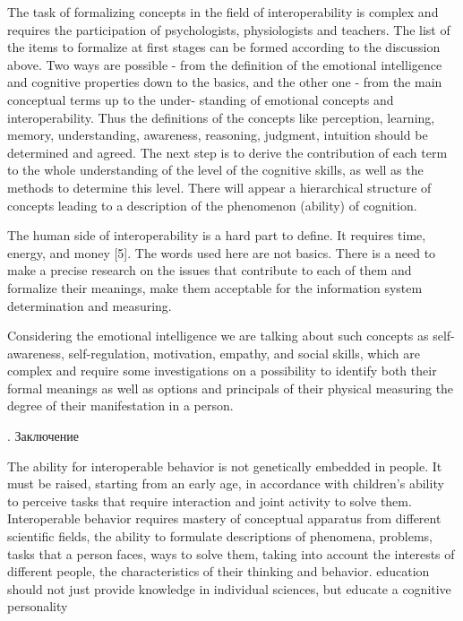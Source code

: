 \documentclass[10pt, a4paper]{article}
\begin{document}
\begin{multicols}{2}
        The task of formalizing concepts in the field of interoperability is complex and requires the participation of psychologists, physiologists and teachers. The list of the items to formalize at first stages can be formed according to the discussion above. Two ways are possible - from the definition of the emotional intelligence and cognitive properties down to the basics, and the other one - from the main conceptual terms up to the under- standing of emotional concepts and interoperability. Thus the definitions of the concepts like perception, learning, memory, understanding, awareness, reasoning, judgment, intuition should be determined and agreed. The next step is to derive the contribution of each term to the whole understanding of the level of the cognitive skills, as well as the methods to determine this level. There will appear a hierarchical structure of concepts leading to a description of the phenomenon (ability) of cognition.

        The human side of interoperability is a hard part to define. It requires time, energy, and money [5]. The words used here are not basics. There is a need to make a precise research on the issues that contribute to each of them and formalize their meanings, make them acceptable for the information system determination and measuring.

        Considering the emotional intelligence we are talking about such concepts as self-awareness, self-regulation, motivation, empathy, and social skills, which are complex and require some investigations on a possibility to identify both their formal meanings as well as options and principals of their physical measuring the degree of their manifestation in a person.
        
        \begin{center}
            \MakeUppercase{}. Заключение
        \end{center}

        The ability for interoperable behavior is not genetically embedded in people. It must be raised, starting from an early age, in accordance with children’s ability to perceive tasks that require interaction and joint activity to solve them. Interoperable behavior requires mastery of conceptual apparatus from different scientific fields, the ability to formulate descriptions of phenomena, problems, tasks that a person faces, ways to solve them, taking into account the interests of different people, the characteristics of their thinking and behavior. education should not just provide knowledge in individual sciences, but educate a cognitive personality
    \end{multicols}
\end{document}
